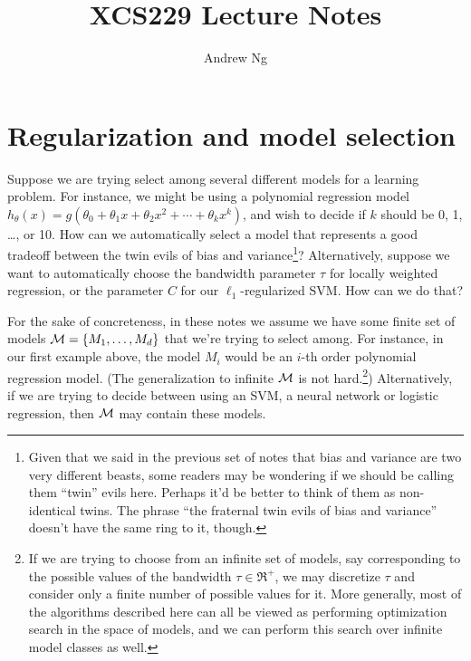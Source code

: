 \documentclass{article}
\begin{document}
\title{XCS229 Lecture Notes}
\author{Andrew Ng}
\date{}
\maketitle


\noindent


\setcounter{part}{5}
\part{Regularization and model selection}


Suppose we are trying select among several different models
for a learning problem.  For instance, we might be using a polynomial
regression model 
$h_\theta(x) = g(\theta_0 + \theta_1 x + \theta_2 x^2 + \cdots + \theta_k x^k)$,
and wish to decide if $k$ should be 0, 1, \dots, or 10.  
How can we automatically select a
model that represents a good tradeoff 
between the twin evils of bias and variance\footnote{Given that we
said in the previous set of notes that bias and variance are two very different 
beasts, some readers may be wondering if we should be calling them ``twin'' 
evils here.  Perhaps it'd be better to think of them as non-identical twins. 
The phrase ``the fraternal twin evils of bias and variance'' doesn't have 
the same ring to it, though.}?
Alternatively, suppose we want to 
automatically choose the bandwidth parameter $\tau$ for locally weighted regression, 
or the parameter $C$ for our $\ell_1$-regularized SVM.  How can we 
do that?

For the sake of concreteness, in these notes we assume we
have some finite set of models ${\cal M} = \{M_1, \ldots, M_d\}$
that we're trying to select among.  For instance, in our first
example above, the model $M_i$ would be an 
$i$-th order polynomial regression model.
(The generalization to infinite ${\cal M}$ is not 
hard.\footnote{If we are trying to choose from an infinite set of models, say 
corresponding to the possible values of the bandwidth $\tau \in \Re^+$, we 
may discretize $\tau$ and consider only a finite number 
of possible values for it.  More generally, most of the algorithms described here 
can all be viewed as performing optimization search in the space
of models, and we can perform this search over infinite model
classes as well.}) 
Alternatively, if we are trying to decide between using an SVM,
a neural network or logistic regression, then ${\cal M}$ may 
contain these models. 
\end{document}
